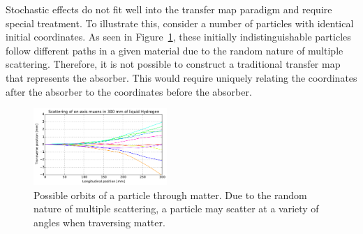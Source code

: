 \documentclass{jacow}
\begin{document}
Stochastic effects do not fit well into the transfer map paradigm and require special treatment. To illustrate this, consider a number of particles with identical initial coordinates. As seen in Figure~\ref{fig:mult_scattering}, these initially indistinguishable particles follow different paths in a given material due to the random nature of multiple scattering. Therefore, it is not possible to construct a traditional transfer map that represents the absorber. This would require uniquely relating the coordinates after the absorber to the coordinates before the absorber.

\begin{figure}[htb]
\centering
\includegraphics[width=0.45\textwidth]{p10tr.pdf}
\caption{Possible orbits of a particle through matter. Due to the random nature of multiple scattering, a particle may scatter at a variety of angles when traversing matter.}
\label{fig:mult_scattering}
\end{figure}

\end{document}

